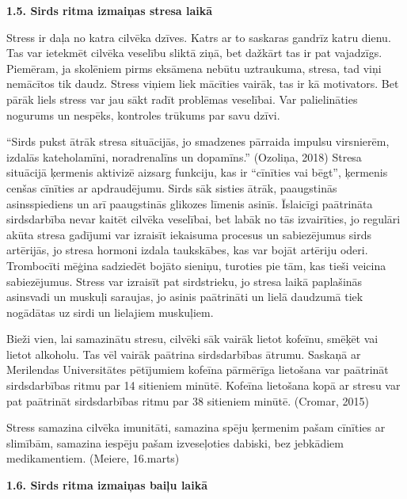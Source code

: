 \documentclass[12pt]{article}
\begin{document}
\begin{center}
\fontsize{14}{}\selectfont\textbf{1.5. Sirds ritma izmaiņas stresa laikā}
\end{center}

Stress ir daļa no katra cilvēka dzīves. Katrs ar to saskaras gandrīz katru dienu. Tas var ietekmēt cilvēka veselību sliktā ziņā, bet dažkārt tas ir pat vajadzīgs. Piemēram, ja skolēniem pirms eksāmena nebūtu uztraukuma, stresa, tad viņi nemācītos tik daudz. Stress viņiem liek mācīties vairāk, tas ir kā motivators. Bet pārāk liels stress var jau sākt radīt problēmas veselībai. Var palielināties nogurums un nespēks, kontroles trūkums par savu dzīvi.\par
“Sirds pukst ātrāk stresa situācijās, jo smadzenes pārraida impulsu virsnierēm, izdalās kateholamīni, noradrenalīns un dopamīns.” (Ozoliņa, 2018) Stresa situācijā ķermenis aktivizē aizsarg funkciju, kas ir  “cīnīties vai bēgt”, ķermenis cenšas cīnīties ar apdraudējumu. Sirds sāk sisties ātrāk, paaugstinās asinsspiediens un arī paaugstinās glikozes līmenis asinīs. Īslaicīgi paātrināta sirdsdarbība nevar kaitēt cilvēka veselībai, bet labāk no tās izvairīties, jo regulāri akūta stresa gadījumi var izraisīt iekaisuma procesus un sabiezējumus sirds artērijās, jo stresa hormoni izdala taukskābes, kas var bojāt artēriju oderi. Trombocīti mēģina sadziedēt bojāto sieniņu, turoties pie tām, kas tieši veicina sabiezējumus. Stress var izraisīt pat sirdstrieku, jo stresa laikā paplašinās asinsvadi un muskuļi saraujas, jo asinis paātrināti un lielā daudzumā tiek nogādātas uz sirdi un lielajiem muskuļiem. \par
Bieži vien, lai samazinātu stresu, cilvēki sāk vairāk lietot kofeīnu, smēķēt vai lietot alkoholu. Tas vēl vairāk paātrina sirdsdarbības ātrumu. Saskaņā ar Merilendas Universitātes pētījumiem kofeīna pārmērīga lietošana var paātrināt sirdsdarbības ritmu par 14 sitieniem minūtē. Kofeīna lietošana kopā ar stresu var pat paātrināt sirdsdarbības ritmu par 38 sitieniem minūtē. (Cromar, 2015) \par
Stress samazina cilvēka imunitāti, samazina spēju ķermenim pašam cīnīties ar slimībām, samazina iespēju pašam izveseļoties dabiski, bez jebkādiem medikamentiem. (Meiere, 16.marts)

\begin{center}
\fontsize{14}{}\selectfont\textbf{1.6. Sirds ritma izmaiņas baiļu laikā}
\end{center}
\end{document}
